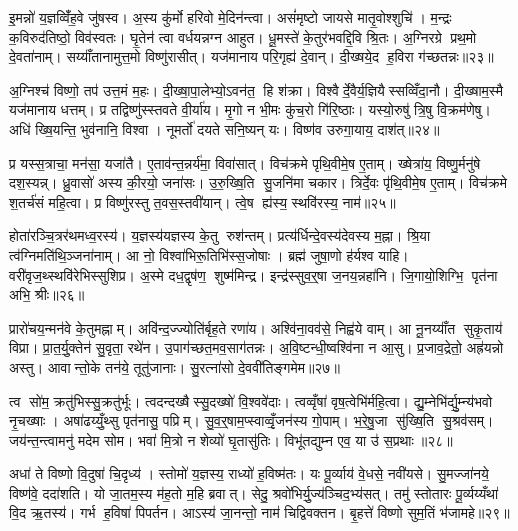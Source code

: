 इ॒मन्नो॑ य॒ज्ञव्विँ॑ह॒वे जु॑षस्व। अ॒स्य कु॑र्मो हरिवो मे॒दिन॑न्त्वा। असं॑मृष्टो जायसे मातृ॒वोश्शुचि॑। म॒न्द्रः क॒विरुद॑तिष्ठो॒ विव॑स्वतः। घृ॒तेन॑ त्वा वर्धयन्नग्न आहुत। धू॒मस्ते॑ के॒तुर॑भवद्दि॒वि श्रि॒तः। अ॒ग्निरग्रे प्रथ॒मो दे॒वता॑नाम्। सय्याँ॑तानामुत्त॒मो विष्णु॑रासीत्। यज॑मानाय परि॒गृह्य॑ दे॒वान्। दी॒ख्षये॒द ह॒विरा ग॑च्छतन्नः॥२३॥

अ॒ग्निश्च॑ विष्णो॒ तप॑ उत्त॒मं म॒हः। दी॒ख्षा॒पा॒लेभ्यो॒ऽवन॑त॒ हि श॑क्रा। विश्वैर्दे॒वैर्य॒ज्ञियैस्सव्विँदा॒नौ। दी॒ख्षाम॒स्मै यज॑मानाय धत्तम्। प्र तद्विष्णु॑स्स्तवते वी॒र्या॑य। मृ॒गो न भी॒मः कु॑च॒रो गि॑रि॒ष्ठाः। यस्यो॒रुषु॑ त्रि॒षु वि॒क्रम॑णेषु। अधि॑ ख्षि॒यन्ति॒ भुव॑नानि॒ विश्वा। नूमर्तो॑ दयते सनि॒ष्यन् यः। विष्ण॑व उरुगा॒याय॒ दाश॑त्॥२४॥

प्र यस्स॒त्राचा॒ मन॑सा॒ यजा॑तै। ए॒ताव॑न्त॒न्नर्य॑मा॒ विवा॑सात्। विच॑क्रमे पृथि॒वीमे॒ष ए॒ताम्। ख्षेत्रा॑य॒ विष्णु॒र्मनु॑षे दश॒स्यन्न्। ध्रु॒वासो॑ अस्य की॒रयो॒ जना॑सः। उ॒रु॒ख्षि॒ति सु॒जनि॑मा चकार। त्रिर्दे॒वः पृ॑थि॒वीमे॒ष ए॒ताम्। विच॑क्रमे श॒तर्च॑सं महि॒त्वा। प्र विष्णु॑रस्तु त॒वस॒स्तवी॑यान्। त्वे॒ष ह्य॑स्य॒ स्थवि॑रस्य॒ नाम॑॥२५॥

होता॑रञ्चि॒त्रर॑थमध्व॒रस्य॑। य॒ज्ञस्य॑यज्ञस्य के॒तु रुश॑न्तम्। प्रत्य॑र्धिन्दे॒वस्य॑देवस्य म॒ह्ना। श्रि॒या त्व॑ग्निमति॑थि॒ञ्जना॑नाम्। आ नो॒ विश्वा॑भिरू॒तिभि॑स्स॒जोषाः। ब्रह्म॑ जुषा॒णो ह॑र्यश्व याहि। वरी॑वृज॒थ्स्थवि॑रेभिस्सुशिप्र। अ॒स्मे दध॒द्वृष॑ण॒ शुष्म॑मिन्द्र। इन्द्र॑स्सुव॒र्॒षा ज॒नय॒न्नहा॑नि। जि॒गायो॒शिग्भि॒ पृत॑ना अभि॒ श्रीः॥२६॥

प्रारो॑चय॒न्मन॑वे के॒तुमह्नाम्। अवि॑न्द॒ज्ज्योति॑र्बृह॒ते रणा॑य। अश्वि॑ना॒वव॑से॒ निह्व॑ये वाम्। आ नू॒नय्याँ॑त सुकृ॒ताय॑ विप्रा। प्रा॒त॒र्यु॒क्तेन॑ सु॒वृता॒ रथे॑न। उ॒पाग॑च्छत॒मव॒साग॑तन्नः। अ॒वि॒ष्टन्धी॒ष्वश्वि॑ना न आ॒सु। प्र॒जाव॒द्रेतो॒ अह्र॑यन्नो अस्तु। आवान्तो॒के तन॑ये॒ तूतु॑जानाः। सु॒रत्ना॑सो दे॒ववी॑तिङ्गमेम॥२७॥

त्व सो॑म॒ क्रतु॑भिस्सु॒क्रतु॑र्भूः। त्वदन्दख्षैस्सु॒दख्षो॑ वि॒श्ववे॑दाः। त्वव्वृँषा॑ वृष॒त्वेभि॑र्महि॒त्वा। द्यु॒म्नेभि॑र्द्यु॒म्न्य॑भवो नृ॒चख्षाः। अषा॑ढय्युँ॒थ्सु पृत॑नासु॒ पप्रिम्। सु॒व॒र्॒षाम॒प्स्वाव्वृँ॒जन॑स्य गो॒पाम्। भ॒रे॒षु॒जा सु॑ख्षि॒ति सु॒श्रव॑सम्। जय॑न्त॒न्त्वामनु॑ मदेम सोम। भवा॑ मि॒त्रो न शेव्यो॑ घृ॒तासु॑तिः। विभू॑तद्युम्न एव॒ या उ॑ स॒प्रथाः॥२८॥

अधा॑ ते विष्णो वि॒दुषा॑ चि॒दृध्य॑। स्तोमो॑ य॒ज्ञस्य॒ राध्यो॑ ह॒विष्म॑तः। यः पू॒र्व्याय॑ वे॒धसे॒ नवी॑यसे। सु॒मज्जा॑नये॒ विष्ण॑वे॒ ददा॑शति। यो जा॒तम॒स्य म॑ह॒तो म॒हि ब्रवात्। सेदु॒ श्रवो॑भिर्यु॒ज्य॑ञ्चिद॒भ्य॑सत्। तमु॑ स्तोतारः पू॒र्व्यय्यँथा॑ वि॒द ऋ॒तस्य॑। गर्भ ह॒विषा॑ पिपर्तन। आऽस्य॑ जा॒नन्तो॒ नाम॑ चिद्विवक्तन। बृ॒हत्ते॑ विष्णो सुम॒तिं भ॑जामहे॥२९॥

